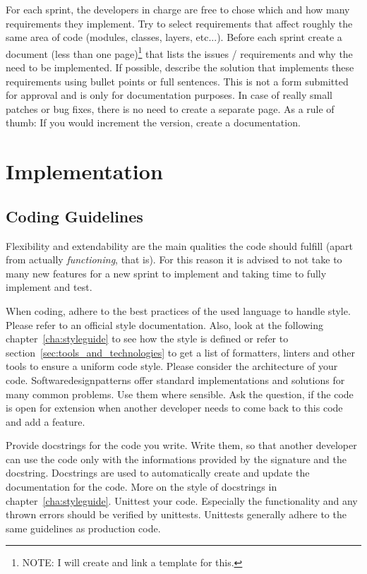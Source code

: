 For each sprint, the developers in charge are free to chose which and how many requirements they implement. Try to select
requirements that affect roughly the same area of code (modules, classes, layers, etc...). Before each sprint create a document
(less than one page)\footnote{NOTE: I will create and link a template for this.} that lists the issues / requirements and why the
need to be implemented. If possible, describe the solution that implements these requirements using bullet points or full
sentences. This is not a form submitted for approval and is only for documentation purposes. In case of really small patches or
bug fixes, there is no need to create a separate page. As a rule of thumb: If you would increment the version, create a
documentation.

\section{Implementation}\label{sec:implementation}
\subsection{Coding Guidelines}\label{sec:coding_guidelines}
Flexibility and extendability are the main qualities the code should fulfill (apart from actually \emph{functioning}, that is).
For this reason it is advised to not take to many new features for a new sprint to implement and taking time to fully implement
and test. 

When coding, adhere to the best practices of the used language to handle style. Please refer to an official style documentation.
Also, look at the following chapter~\ref{cha:styleguide} to see how the style is defined or refer to
section~\ref{sec:tools_and_technologies} to get a list of formatters, linters and other tools to ensure a uniform code style.
Please consider the architecture of your code. Softwaredesignpatterns offer standard implementations and solutions for many common
problems. Use them where sensible. Ask the question, if the code is open for extension when another developer needs to come back
to this code and add a feature.

Provide docstrings for the code you write. Write them, so that another developer can use the code only with the informations
provided by the signature and the docstring. Docstrings are used to automatically create and update the documentation for the
code. More on the style of docstrings in chapter~\ref{cha:styleguide}. Unittest your code. Especially the functionality and
any thrown errors should be verified by unittests. Unittests generally adhere to the same guidelines as production code.

